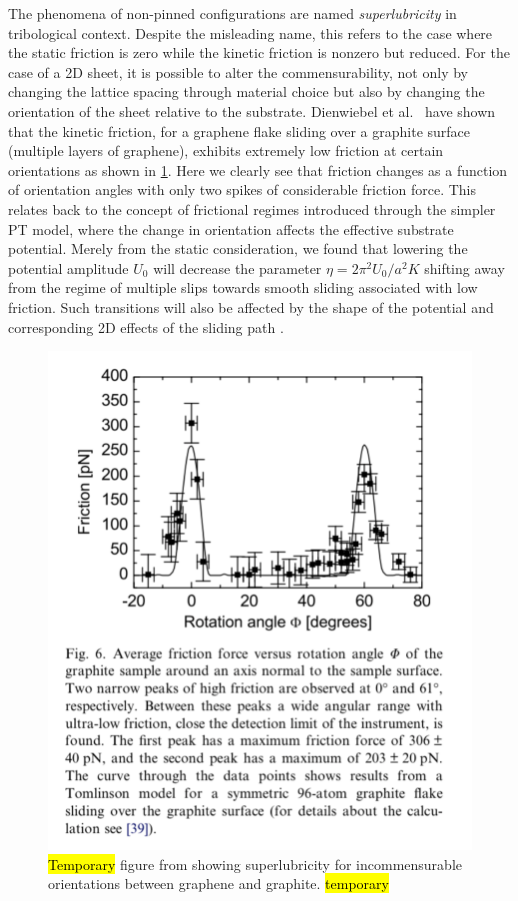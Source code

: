 The phenomena of non-pinned configurations are named \textit{superlubricity} in
tribological context. Despite the misleading name, this refers to the case
where the static friction is zero while the kinetic friction is nonzero but
reduced. For the case of a 2D sheet, it is possible to alter the
commensurability, not only by changing the lattice spacing through material
choice but also by changing the orientation of the sheet relative to the
substrate. Dienwiebel et al.\ \cite{DIENWIEBEL2005197} have shown that the
kinetic friction, for a graphene flake sliding over a graphite surface (multiple
layers of graphene), exhibits extremely low friction at certain orientations as
shown in \cref{fig:graphene_rot}. Here we clearly see that friction changes as a
function of orientation angles with only two spikes of considerable friction
force. This relates back to the concept of frictional regimes introduced through
the simpler \acrshort{PT} model, where the change in orientation affects the
effective substrate potential. Merely from the static consideration, we found that
lowering the potential amplitude $U_0$ will decrease the parameter $\eta =
2\pi^2U_0/a^2K$ shifting away from the regime of multiple slips towards smooth
sliding associated with low friction. Such transitions will also be affected by the shape of the
potential and corresponding 2D effects of the sliding path \cite{Yalin_2011}.

\begin{figure}[H]
  \centering
  \includegraphics[width=0.5\linewidth]{figures/theory/graphene_rot.png}
  \caption{\hl{Temporary} figure from \cite{DIENWIEBEL2005197} showing superlubricity for incommensurable orientations between graphene and graphite. \hl{temporary}}
  \label{fig:graphene_rot}
\end{figure}




